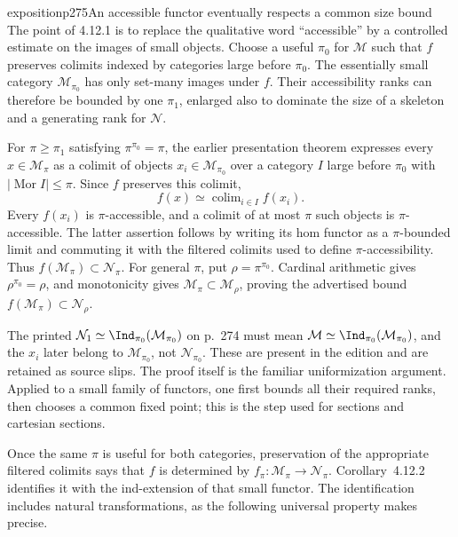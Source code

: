 \begin{dcomment}{exposition}{p275}{An accessible functor eventually respects a common size bound}
The point of 4.12.1 is to replace the qualitative word ``accessible'' by a controlled estimate on the images of small objects. Choose a useful $\pi_0$ for $\mathcal M$ such that $f$ preserves colimits indexed by categories large before $\pi_0$. The essentially small category $\mathcal M_{\pi_0}$ has only set-many images under $f$. Their accessibility ranks can therefore be bounded by one $\pi_1$, enlarged also to dominate the size of a skeleton and a generating rank for $\mathcal N$.

For $\pi\geq\pi_1$ satisfying $\pi^{\pi_0}=\pi$, the earlier presentation theorem expresses every $x\in\mathcal M_\pi$ as a colimit of objects $x_i\in\mathcal M_{\pi_0}$ over a category $I$ large before $\pi_0$ with $|\operatorname{Mor}I|\leq\pi$. Since $f$ preserves this colimit,
\[
 f(x)\simeq\operatorname{colim}_{i\in I}f(x_i).
\]
Every $f(x_i)$ is $\pi$-accessible, and a colimit of at most $\pi$ such objects is $\pi$-accessible. The latter assertion follows by writing its hom functor as a $\pi$-bounded limit and commuting it with the filtered colimits used to define $\pi$-accessibility. Thus $f(\mathcal M_\pi)\subset\mathcal N_\pi$. For general $\pi$, put $\rho=\pi^{\pi_0}$. Cardinal arithmetic gives $\rho^{\pi_0}=\rho$, and monotonicity gives $\mathcal M_\pi\subset\mathcal M_\rho$, proving the advertised bound $f(\mathcal M_\pi)\subset\mathcal N_\rho$.

The printed $\mathcal N_1\simeq\Ind_{\pi_0}(\mathcal M_{\pi_0})$ on p.~274 must mean $\mathcal M\simeq\Ind_{\pi_0}(\mathcal M_{\pi_0})$, and the $x_i$ later belong to $\mathcal M_{\pi_0}$, not $\mathcal N_{\pi_0}$. These are present in the edition and are retained as source slips. The proof itself is the familiar uniformization argument. Applied to a small family of functors, one first bounds all their required ranks, then chooses a common fixed point; this is the step used for sections and cartesian sections.

Once the same $\pi$ is useful for both categories, preservation of the appropriate filtered colimits says that $f$ is determined by $f_\pi:\mathcal M_\pi\to\mathcal N_\pi$. Corollary~4.12.2 identifies it with the ind-extension of that small functor. The identification includes natural transformations, as the following universal property makes precise.
\end{dcomment}

